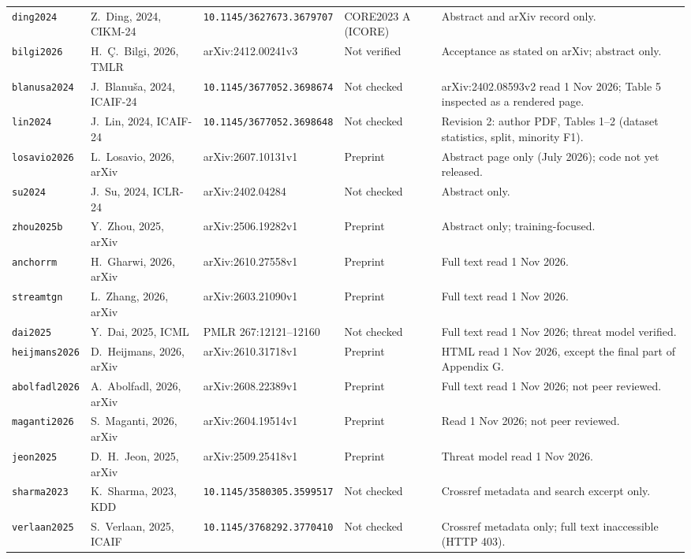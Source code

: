 \documentclass[11pt,a4paper]{article}
\begin{document}
\begin{table}[htbp]
\begin{tabularx}{\textwidth}{L{1.7cm} L{2.9cm} L{2.6cm} L{2.3cm} X}
\texttt{ding2024} & Z.~Ding, 2024, CIKM-24 & \nolinkurl{10.1145/3627673.3679707} & CORE2023 A (ICORE) & Abstract and arXiv record only. \\
\texttt{bilgi2026} & H.~\c{C}.~Bilgi, 2026, TMLR & arXiv:2412.00241v3 & Not verified & Acceptance as stated on arXiv; abstract only. \\
\texttt{blanusa2024} & J.~Blanu\v{s}a, 2024, ICAIF-24 & \nolinkurl{10.1145/3677052.3698674} & Not checked & arXiv:2402.08593v2 read 1 Nov 2026; Table 5 inspected as a rendered page. \\
\texttt{lin2024} & J.~Lin, 2024, ICAIF-24 & \nolinkurl{10.1145/3677052.3698648} & Not checked & Revision 2: author PDF, Tables 1--2 (dataset statistics, split, minority F1). \\
\texttt{losavio2026} & L.~Losavio, 2026, arXiv & arXiv:2607.10131v1 & Preprint & Abstract page only (July 2026); code not yet released. \\
\texttt{su2024} & J.~Su, 2024, ICLR-24 & arXiv:2402.04284 & Not checked & Abstract only. \\
\texttt{zhou2025b} & Y.~Zhou, 2025, arXiv & arXiv:2506.19282v1 & Preprint & Abstract only; training-focused. \\
\texttt{anchorrm} & H.~Gharwi, 2026, arXiv & arXiv:2610.27558v1 & Preprint & Full text read 1 Nov 2026. \\
\texttt{streamtgn} & L.~Zhang, 2026, arXiv & arXiv:2603.21090v1 & Preprint & Full text read 1 Nov 2026. \\
\texttt{dai2025} & Y.~Dai, 2025, ICML & PMLR 267:12121--12160 & Not checked & Full text read 1 Nov 2026; threat model verified. \\
\texttt{heijmans2026} & D.~Heijmans, 2026, arXiv & arXiv:2610.31718v1 & Preprint & HTML read 1 Nov 2026, except the final part of Appendix G. \\
\texttt{abolfadl2026} & A.~Abolfadl, 2026, arXiv & arXiv:2608.22389v1 & Preprint & Full text read 1 Nov 2026; not peer reviewed. \\
\texttt{maganti2026} & S.~Maganti, 2026, arXiv & arXiv:2604.19514v1 & Preprint & Read 1 Nov 2026; not peer reviewed. \\
\texttt{jeon2025} & D.~H.~Jeon, 2025, arXiv & arXiv:2509.25418v1 & Preprint & Threat model read 1 Nov 2026. \\
\texttt{sharma2023} & K.~Sharma, 2023, KDD & \nolinkurl{10.1145/3580305.3599517} & Not checked & Crossref metadata and search excerpt only. \\
\texttt{verlaan2025} & S.~Verlaan, 2025, ICAIF & \nolinkurl{10.1145/3768292.3770410} & Not checked & Crossref metadata only; full text inaccessible (HTTP 403). \\

\end{tabularx}
\end{table}
\end{document}
